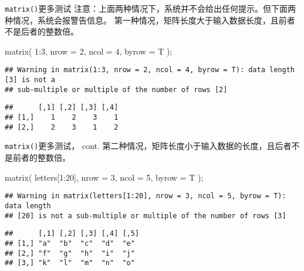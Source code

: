 \documentclass[ignorenonframetext,]{beamer}
\newenvironment{Shaded}{\begin{snugshade}}{\end{snugshade}}
\newcommand{\AttributeTok}[1]{\textcolor[rgb]{0.77,0.63,0.00}{#1}}
\newcommand{\DecValTok}[1]{\textcolor[rgb]{0.00,0.00,0.81}{#1}}
\newcommand{\FunctionTok}[1]{\textcolor[rgb]{0.00,0.00,0.00}{#1}}
\newcommand{\NormalTok}[1]{#1}
\newcommand{\SpecialCharTok}[1]{\textcolor[rgb]{0.00,0.00,0.00}{#1}}
\newcommand\FontSmall{\fontsize{7}{8}\selectfont}
\begin{document}
\begin{frame}[fragile]{\texttt{matrix()}更多测试}
\protect\hypertarget{matrixux66f4ux591aux6d4bux8bd5}{}
注意：上面两种情况下，系统并不会给出任何提示。但下面两种情况，系统会报警告信息。
第一种情况，矩阵长度大于输入数据长度，且前者不是后者的整数倍。

\FontSmall

\begin{Shaded}
\begin{Highlighting}[]
\FunctionTok{matrix}\NormalTok{( }\DecValTok{1}\SpecialCharTok{:}\DecValTok{3}\NormalTok{, }\AttributeTok{nrow =} \DecValTok{2}\NormalTok{, }\AttributeTok{ncol =} \DecValTok{4}\NormalTok{, }\AttributeTok{byrow =}\NormalTok{ T );}
\end{Highlighting}
\end{Shaded}

\begin{verbatim}
## Warning in matrix(1:3, nrow = 2, ncol = 4, byrow = T): data length [3] is not a
## sub-multiple or multiple of the number of rows [2]
\end{verbatim}

\begin{verbatim}
##      [,1] [,2] [,3] [,4]
## [1,]    1    2    3    1
## [2,]    2    3    1    2
\end{verbatim}
\end{frame}

\begin{frame}[fragile]{\texttt{matrix()}更多测试， cont.}
\protect\hypertarget{matrixux66f4ux591aux6d4bux8bd5-cont.}{}
第二种情况，矩阵长度小于输入数据的长度，且后者不是前者的整数倍。

\FontSmall

\begin{Shaded}
\begin{Highlighting}[]
\FunctionTok{matrix}\NormalTok{( letters[}\DecValTok{1}\SpecialCharTok{:}\DecValTok{20}\NormalTok{], }\AttributeTok{nrow =} \DecValTok{3}\NormalTok{, }\AttributeTok{ncol =} \DecValTok{5}\NormalTok{, }\AttributeTok{byrow =}\NormalTok{ T );}
\end{Highlighting}
\end{Shaded}

\begin{verbatim}
## Warning in matrix(letters[1:20], nrow = 3, ncol = 5, byrow = T): data length
## [20] is not a sub-multiple or multiple of the number of rows [3]
\end{verbatim}

\begin{verbatim}
##      [,1] [,2] [,3] [,4] [,5]
## [1,] "a"  "b"  "c"  "d"  "e" 
## [2,] "f"  "g"  "h"  "i"  "j" 
## [3,] "k"  "l"  "m"  "n"  "o"
\end{verbatim}
\end{frame}
\end{document}
